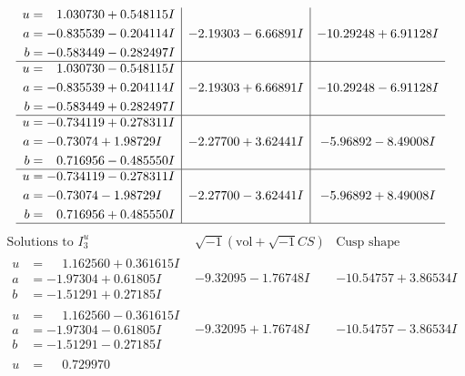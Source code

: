 \documentclass[1p]{elsarticle_modified}
\theoremstyle{definition}
\newcommand{\I}{\sqrt{-1}}
\begin{document}
$$\begin{array}{c|c|c}
\begin{aligned}
u &= \phantom{-}1.030730 + 0.548115 I \\
a &= -0.835539 - 0.204114 I \\
b &= -0.583449 - 0.282497 I\end{aligned}
 & -2.19303 - 6.66891 I & -10.29248 + 6.91128 I \\ \hline\begin{aligned}
u &= \phantom{-}1.030730 - 0.548115 I \\
a &= -0.835539 + 0.204114 I \\
b &= -0.583449 + 0.282497 I\end{aligned}
 & -2.19303 + 6.66891 I & -10.29248 - 6.91128 I \\ \hline\begin{aligned}
u &= -0.734119 + 0.278311 I \\
a &= -0.73074 + 1.98729 I \\
b &= \phantom{-}0.716956 - 0.485550 I\end{aligned}
 & -2.27700 + 3.62441 I & -5.96892 - 8.49008 I \\ \hline\begin{aligned}
u &= -0.734119 - 0.278311 I \\
a &= -0.73074 - 1.98729 I \\
b &= \phantom{-}0.716956 + 0.485550 I\end{aligned}
 & -2.27700 - 3.62441 I & -5.96892 + 8.49008 I\\
 \hline 
 \end{array}$$\newpage$$\begin{array}{c|c|c}  
\text{Solutions to }I^u_{3}& \I (\text{vol} + \sqrt{-1}CS) & \text{Cusp shape}\\
 \hline 
\begin{aligned}
u &= \phantom{-}1.162560 + 0.361615 I \\
a &= -1.97304 + 0.61805 I \\
b &= -1.51291 + 0.27185 I\end{aligned}
 & -9.32095 - 1.76748 I & -10.54757 + 3.86534 I \\ \hline\begin{aligned}
u &= \phantom{-}1.162560 - 0.361615 I \\
a &= -1.97304 - 0.61805 I \\
b &= -1.51291 - 0.27185 I\end{aligned}
 & -9.32095 + 1.76748 I & -10.54757 - 3.86534 I \\ \hline\begin{aligned}
u &= \phantom{-}0.729970\phantom{ +0.000000I} \\

\end{aligned}
\end{array}$$
\end{document}
